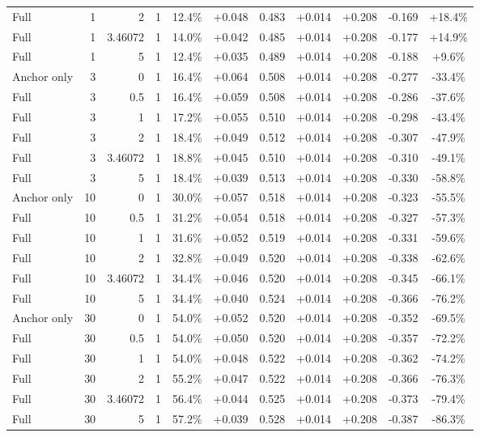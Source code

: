 \begin{table}[htbp]
\begin{tabular}{lrrrccccccc}
Full & 1 & 2 & 1 & 12.4\% & +0.048 & 0.483 & +0.014 & +0.208 & -0.169 & +18.4\% \\
Full & 1 & 3.46072 & 1 & 14.0\% & +0.042 & 0.485 & +0.014 & +0.208 & -0.177 & +14.9\% \\
Full & 1 & 5 & 1 & 12.4\% & +0.035 & 0.489 & +0.014 & +0.208 & -0.188 & +9.6\% \\
Anchor only & 3 & 0 & 1 & 16.4\% & +0.064 & 0.508 & +0.014 & +0.208 & -0.277 & -33.4\% \\
Full & 3 & 0.5 & 1 & 16.4\% & +0.059 & 0.508 & +0.014 & +0.208 & -0.286 & -37.6\% \\
Full & 3 & 1 & 1 & 17.2\% & +0.055 & 0.510 & +0.014 & +0.208 & -0.298 & -43.4\% \\
Full & 3 & 2 & 1 & 18.4\% & +0.049 & 0.512 & +0.014 & +0.208 & -0.307 & -47.9\% \\
Full & 3 & 3.46072 & 1 & 18.8\% & +0.045 & 0.510 & +0.014 & +0.208 & -0.310 & -49.1\% \\
Full & 3 & 5 & 1 & 18.4\% & +0.039 & 0.513 & +0.014 & +0.208 & -0.330 & -58.8\% \\
Anchor only & 10 & 0 & 1 & 30.0\% & +0.057 & 0.518 & +0.014 & +0.208 & -0.323 & -55.5\% \\
Full & 10 & 0.5 & 1 & 31.2\% & +0.054 & 0.518 & +0.014 & +0.208 & -0.327 & -57.3\% \\
Full & 10 & 1 & 1 & 31.6\% & +0.052 & 0.519 & +0.014 & +0.208 & -0.331 & -59.6\% \\
Full & 10 & 2 & 1 & 32.8\% & +0.049 & 0.520 & +0.014 & +0.208 & -0.338 & -62.6\% \\
Full & 10 & 3.46072 & 1 & 34.4\% & +0.046 & 0.520 & +0.014 & +0.208 & -0.345 & -66.1\% \\
Full & 10 & 5 & 1 & 34.4\% & +0.040 & 0.524 & +0.014 & +0.208 & -0.366 & -76.2\% \\
Anchor only & 30 & 0 & 1 & 54.0\% & +0.052 & 0.520 & +0.014 & +0.208 & -0.352 & -69.5\% \\
Full & 30 & 0.5 & 1 & 54.0\% & +0.050 & 0.520 & +0.014 & +0.208 & -0.357 & -72.2\% \\
Full & 30 & 1 & 1 & 54.0\% & +0.048 & 0.522 & +0.014 & +0.208 & -0.362 & -74.2\% \\
Full & 30 & 2 & 1 & 55.2\% & +0.047 & 0.522 & +0.014 & +0.208 & -0.366 & -76.3\% \\
Full & 30 & 3.46072 & 1 & 56.4\% & +0.044 & 0.525 & +0.014 & +0.208 & -0.373 & -79.4\% \\
Full & 30 & 5 & 1 & 57.2\% & +0.039 & 0.528 & +0.014 & +0.208 & -0.387 & -86.3\% \\

\end{tabular}
\end{table}
